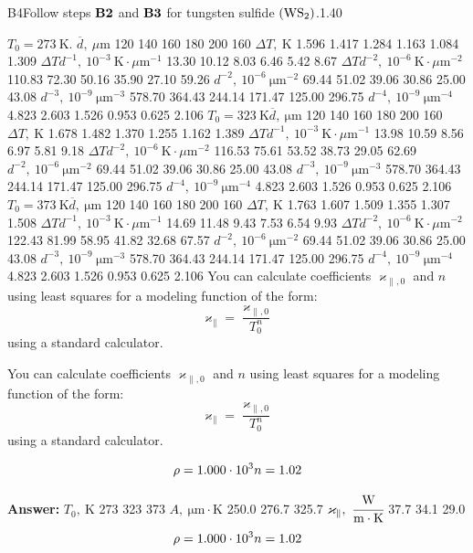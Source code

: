 \documentclass[11pt,a4paper]{article}
\begin{document}
\begin{solcard}{B4}{Follow steps $\bf B2$ and $\bf B3$ for tungsten sulfide $\rm(WS_2)$.}{1.40}

$T_0=273~\mathrm{K}$. $\overline{d},~\mu\text{m}$ 120 140 160 180 200 160 $\Delta T,~\mathrm{K}$ 1.596 1.417 1.284 1.163 1.084 1.309 $\Delta Td^{-1},~10^{-3}~\mathrm{K}\cdot\mu\text{m}^{-1}$ 13.30 10.12 8.03 6.46 5.42 8.67 $\Delta Td^{-2},~10^{-6}~\mathrm{K}\cdot\mu\text{m}^{-2}$ 110.83 72.30 50.16 35.90 27.10 59.26 $d^{-2},~10^{-6}~\mathrm{\mu m}^{-2}$ 69.44 51.02 39.06 30.86 25.00 43.08 $d^{-3},~10^{-9}~\mathrm{\mu m}^{-3}$ 578.70 364.43 244.14 171.47 125.00 296.75 $d^{-4},~10^{-9}~\mathrm{\mu m}^{-4}$ 4.823 2.603 1.526 0.953 0.625 2.106 $T_0=323~\mathrm{K}\overline{d},~\mathrm{\mu m}$ 120 140 160 180 200 160 $\Delta T,~\mathrm{K}$ 1.678 1.482 1.370 1.255 1.162 1.389 $\Delta Td^{-1},~10^{-3}~\mathrm{K}\cdot\mu\text{m}^{-1}$ 13.98 10.59 8.56 6.97 5.81 9.18 $\Delta Td^{-2},~10^{-6}~\mathrm{K}\cdot\mu\text{m}^{-2}$ 116.53 75.61 53.52 38.73 29.05 62.69 $d^{-2},~10^{-6}~\mathrm{\mu m}^{-2}$ 69.44 51.02 39.06 30.86 25.00 43.08 $d^{-3},~10^{-9}~\mathrm{\mu m}^{-3}$ 578.70 364.43 244.14 171.47 125.00 296.75 $d^{-4},~10^{-9}~\mathrm{\mu m}^{-4}$ 4.823 2.603 1.526 0.953 0.625 2.106 $T_0=373~\mathrm{K}\overline{d},~\mathrm{\mu m}$ 120 140 160 180 200 160 $\Delta T,~\mathrm{K}$ 1.763 1.607 1.509 1.355 1.307 1.508 $\Delta Td^{-1},~10^{-3}~\mathrm{K}\cdot\mu\text{m}^{-1}$ 14.69 11.48 9.43 7.53 6.54 9.93 $\Delta Td^{-2},~10^{-6}~\mathrm{K}\cdot\mu\text{m}^{-2}$ 122.43 81.99 58.95 41.82 32.68 67.57 $d^{-2},~10^{-6}~\mathrm{\mu m}^{-2}$ 69.44 51.02 39.06 30.86 25.00 43.08 $d^{-3},~10^{-9}~\mathrm{\mu m}^{-3}$ 578.70 364.43 244.14 171.47 125.00 296.75 $d^{-4},~10^{-9}~\mathrm{\mu m}^{-4}$ 4.823 2.603 1.526 0.953 0.625 2.106 You can calculate coefficients $\varkappa_{\parallel,0}$ and $n$ using least squares for a modeling function of the form: \[\varkappa_\parallel=\frac{\varkappa_{\parallel,0}}{T_0^n}\] using a standard calculator.


You can calculate coefficients $\varkappa_{\parallel,0}$ and $n$ using least squares for a modeling function of the form: \[\varkappa_\parallel=\frac{\varkappa_{\parallel,0}}{T_0^n}\] using a standard calculator.


\[\rho=1.000\cdot10^3\\n=1.02\]

\par\smallskip\noindent\textbf{Answer:} $T_0,~\mathrm{K}$ 273 323 373 $A,~\mathrm{\mu m}\cdot\text{K}$ 250.0 276.7 325.7 $\varkappa_\parallel,~\cfrac{\text{W}}{\text{m}\cdot\text{K}}$ 37.7 34.1 29.0 \[\rho=1.000\cdot10^3\\n=1.02\]
\end{solcard}
\end{document}
